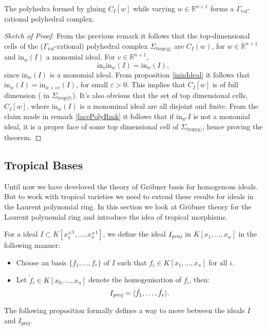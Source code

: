 \begin{theorem}
    \label{grobCompThe}
    The polyhedra formed by gluing $\overline{C_{I}[w]}$ while varying $w\in\mathbb{R}^{n+1}$ forms a $\Gamma_{\text{val}}$-rational polyhedral complex.
\end{theorem}
\begin{proof}[Sketch of Proof]
    From the previous remark it follows that the top-dimensional cells of the ($\Gamma_{\text{val}}$-rational) polyhedral complex $\Sigma_{\text{trop(g)}}$ are $\overline{C_{I}(w)}$, for $w \in \mathbb{R}^{n+1}$ and $\text{in}_{w}(I)$ a monomial ideal.
    For $v \in \mathbb{R}^{n+1}$,
    \[
        \text{in}_{v}\text{in}_{w}(I) = \text{in}_{w}(I),
    \]
    since $\text{in}_{w}(I)$ is a monomial ideal. 
    From proposition \ref{ininIdeal} it follows that $\text{in}_{w}(I) = \text{in}_{w + \varepsilon v}(I)$, for small $\varepsilon >0$.
    This implies that $\overline{C_{I}[w]}$ is of full dimension ( in $\Sigma_{\text{trop(f)}}$).
    It's also obvious that the set of top dimensional cells, $\overline{C_{I}[w]}$, where $\text{in}_{w}(I)$ is a monominal ideal are all disjoint and finite.
    From the claim made in remark \ref{facePolyRmk} it follows that if $\text{in}_{w'}I$ is not a monomial ideal, it is a proper face of some top dimensional cell of $\Sigma_{\text{trop(g)}}$, hence proving the theorem.
\end{proof}

\subsection{Tropical Bases}

Until now we have develoved the theory of Gr\"{o}bner basis for homogenous ideals.
But to work with tropical varieties we need to extend these results for ideals in the Laurent polynomial ring. 
In this section we look at Gr\"obner theory for the Laurent polynomial ring and introduce the idea of tropical morphisms.

\begin{definition}
    For a ideal $I \subset  K[x_{1}^{\pm1}, \dots, x_{n}^{\pm1}]$, we define the ideal $I_{\emph{proj}}$ in $K[x_{1},\dots,x_{n}]$ in the following manner:
    \begin{itemize}
        \item Choose an basis $\{f_{1},\dots,f_{r}\}$ of $I$ such that $f_{i} \in K[x_{1}, \dots, x_{n}]$ for all $i$.
        \item Let $\tilde f_{i} \in K[x_{0},\dots, x_{n}]$ denote the homogenisation of $f_{i}$, then:
            \[
                I_{\emph{proj}} = \langle \tilde f_{1}, \dots, \tilde f_{r} \rangle.
            \]
    \end{itemize}
\end{definition}
The following proposition formally defines a way to move between the ideals $I$ and $I_{\text{proj}}$.


